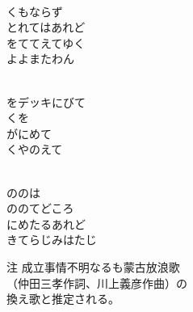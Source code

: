 \documentclass[10pt,b5j]{tarticle} %
\begin{document}
\begin{enumerate} %
    \setlength{\itemindent}{\itemmargin}
    \begin{minipage}[c]{\blocksize}
    
        \vspace{\linespace}
        \item~\\
        くもならず\\
        とれてはあれど\\
        をててえてゆく\\
        よよまたわん

	\end{minipage}
	\begin{minipage}[c]{\blocksize}

        \vspace{\linespace}
        \item~\\
        をデッキにびて\\
        くを\\
        がにめて\\
        くやのえて
        
	\end{minipage}
	\begin{minipage}[c]{\blocksize}

        \vspace{\linespace}
        \item~\\
        ののは\\
        ののてどころ\\
        にめたるあれど\\
        きてらじみはたじ
    
    \end{minipage}
\end{enumerate} %
\begin{flushright}
        注 成立事情不明なるも蒙古放浪歌\\
        （仲田三孝作詞、川上義彦作曲）の\\
        換え歌と推定される。
\end{flushright}
\end{document}
